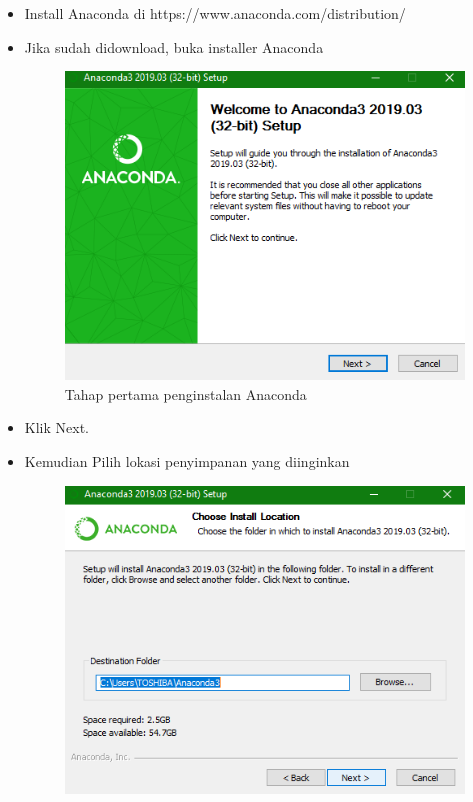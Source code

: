 \begin{enumerate}
\begin{itemize}
\item Install Anaconda di https://www.anaconda.com/distribution/
\item Jika sudah didownload, buka installer Anaconda
\begin{figure}[!htbp]
\centering
\includegraphics[scale=0.7]{figures/C1.png}
\caption{Tahap pertama penginstalan Anaconda}
\end{figure}
\item Klik Next.
\item Kemudian Pilih lokasi penyimpanan yang diinginkan
\begin{figure}[!htbp]
\centering
\includegraphics[scale=0.7]{figures/C2.png}

\end{figure}
\end{itemize}
\end{enumerate}
